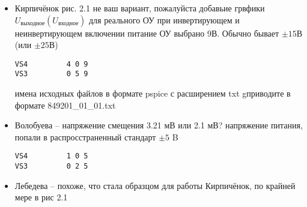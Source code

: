 \documentclass[a4paper,landscape,11pt]{article}
\begin{document}
\begin{itemize}
\item 
	Кирпичёнок рис. 2.1 не ваш вариант, пожалуйста добавьие грвфики  $U_\text{выходное}(U_\text{входное})$ для реального ОУ при инвертирующем и неинвертирующем включении
	питание ОУ выбрано 9В.  Обычно бывает $\pm 15В$ (или $\pm25В$) 
\begin{verbatim}
VS4         4 0 9
VS3         0 5 9
\end{verbatim}
имена  исходных файлов в формате pspice с расширением txt gприводите в формате 849201\_01\_01.txt

\item 
	Волобуева -- напряжение смещения 3.21 мВ или 2.1 мВ? 
напряжение питания, попали в распросстраненный стандарт $\pm5$ B
\begin{verbatim}
VS4         1 0 5
VS3         0 2 5
\end{verbatim}

\item 
	Лебедева -- похоже, что стала образцом для работы Кирпичёнок, по крайней мере в рис 2.1

\end{itemize}
\end{document}
